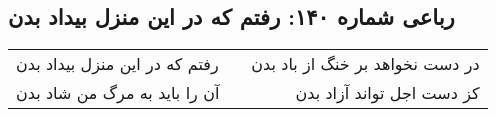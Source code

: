 \begin{center}
\section*{رباعی شماره ۱۴۰: رفتم که در این منزل بیداد بدن}
\label{sec:sh140}
\begin{longtable}{l p{0.5cm} r}
رفتم که در این منزل بیداد بدن
&&
در دست نخواهد بر خنگ از باد بدن
\\
آن را باید به مرگ من شاد بدن
&&
کز دست اجل تواند آزاد بدن
\\
\end{longtable}
\end{center}
